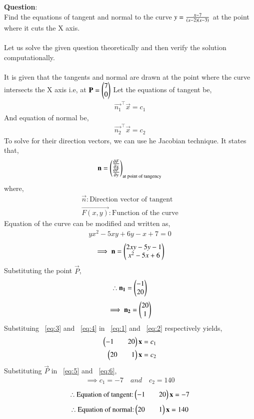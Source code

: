 \documentclass[journal]{IEEEtran}
\begin{document}
\textbf{Question}:\\
Find the equations of tangent and normal to the curve $y=\frac{x-7}{\left(x-2\right)\left(x-3\right)}$ at the point where it cuts the X axis.\\
\solution \\
Let us solve the given question theoretically and then verify the solution computationally.\\
\\
It is given that the tangents and normal are drawn at the point where the curve intersects the X axis i.e, at $\mathbf{P}=\begin{pmatrix}7\\0\end{pmatrix}$ 
Let the equations of tangent be,
\begin{align}
    \vec{n_1}^{\top}\vec{x}=c_1 \label{eq:1}
\end{align}
And equation of normal be,
\begin{align}
    \vec{n_2}^{\top}\vec{x}=c_2 \label{eq:2}
\end{align}
To solve for their direction vectors, we can use he Jacobian technique.
It states that,
\begin{align}
    \mathbf{n}=\begin{pmatrix}\frac{\partial{F}}{\partial{x}}\\\frac{\partial{F}}{\partial{y}}\end{pmatrix}_{\text{at point of tangency}}
\end{align}
where,
\begin{align*}
    \vec{n}:\text{Direction vector of tangent}\\
    \vec{F(x,y)}:\text{Function of the curve}
\end{align*}
Equation of the curve can be modified and written as,
\begin{align}
    yx^2-5xy+6y-x+7=0
\end{align}
\begin{align}
    \implies \mathbf{n}=\begin{pmatrix}2xy-5y-1\\x^2-5x+6\end{pmatrix}
\end{align}
Substituting the point $\vec{P}$,
\begin{align}
    \therefore \mathbf{n_1}=\begin{pmatrix}-1\\20\end{pmatrix} \label{eq:3}
\end{align}
\begin{align}
    \implies \mathbf{n_2}=\begin{pmatrix}20\\1\end{pmatrix} \label{eq:4}
\end{align}
\newpage
\vspace*{0.25cm}
Substituing ~\eqref{eq:3} and ~\eqref{eq:4} in ~\eqref{eq:1} and ~\eqref{eq:2} respectively yields,
\begin{align}
    \begin{pmatrix}-1&&20\end{pmatrix}\mathbf{x}=c_1 \label{eq:5} \\
    \begin{pmatrix}20&&1\end{pmatrix}\mathbf{x}=c_2 \label{eq:6}
\end{align}
Substituting $\vec{P}$ in ~\eqref{eq:5} and ~\eqref{eq:6},
\begin{align}
    \implies c_1=-7 \quad and \quad c_2=140
\end{align}
\begin{align}
    \therefore \text{Equation of tangent:} \begin{pmatrix}-1&&20\end{pmatrix}\mathbf{x}=-7
\end{align}
\begin{align}
    \therefore \text{Equation of normal:} \begin{pmatrix}20&&1\end{pmatrix}\mathbf{x}=140
\end{align}
\end{document}
